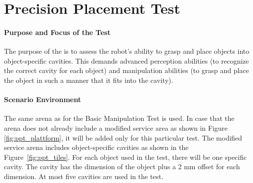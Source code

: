 \newpage
\section{Precision Placement Test}
\label{sec:Precision Placement Test}

\paragraph{Purpose and Focus of the Test}
The purpose of the  is to assess the robot's ability to grasp and place objects into object-specific cavities. This demands advanced perception abilities (to recognize the correct cavity for each object) and manipulation abilities (to grasp and place the object in such a manner that it fits into the cavity).

\paragraph{Scenario Environment}
The same arena as for the Basic Manipulation Test is used. In case that the arena does not already include a modified service area as shown in Figure \ref{fig:ppt_plattform}, it will be added only for this particular test. The modified service arena includes object-specific cavities as shown in the Figure~\ref{fig:ppt_tiles}. For each object used in the test, there will be one specific cavity. The cavity has the dimension of the object plus a 2 mm offset for each dimension. At most five cavities are used in the test.


